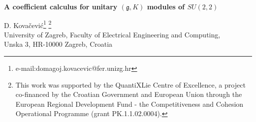 \documentclass[twoside,a4paper,12pt]{article}
\newcommand{\g}{\ensuremath{\mathfrak g}}
\theoremstyle{definition}
\begin{document}
\begin{center}
  {\bf  \Large A coefficient calculus for unitary $(\g,K)$ modules of $SU(2,2)$}
\end{center}
\vspace{5mm}

\begin{center}
  D. Kova\v{c}evi\'{c}{\footnote{e-mail:domagoj.kovacevic@fer.unizg.hr}}
  {\footnote{This work was supported by the QuantiXLie Centre of Excellence, a
  	project co-financed by the Croatian Government and European Union through
  	the European Regional Development Fund - the Competitiveness and Cohesion
  	Operational Programme (grant PK.1.1.02.0004).}}\\
  University of Zagreb, Faculty of Electrical Engineering and Computing,\\
  Unska 3, HR-10000 Zagreb, Croatia
\end{center}
\setcounter{page}{1}
\vspace{7mm}
\end{document}
